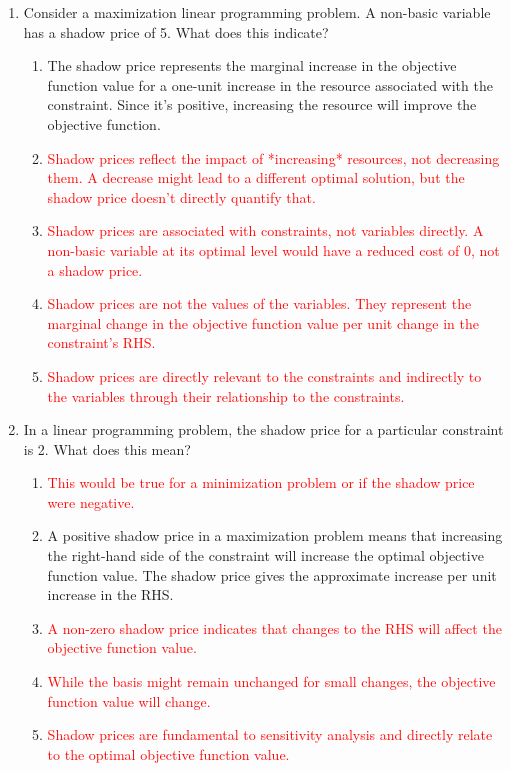 \documentclass{article}%
\newcommand{\incorrect}[1]{\textcolor{red}{#1}}
\begin{document}
\begin{enumerate}
\begin{enumerate}
\end{enumerate}%
\vspace{1em}%
\item Consider a maximization linear programming problem.  A non-basic variable has a shadow price of 5. What does this indicate?%
\begin{enumerate}%
\item The shadow price represents the marginal increase in the objective function value for a one-unit increase in the resource associated with the constraint. Since it's positive, increasing the resource will improve the objective function.%
\item \incorrect{Shadow prices reflect the impact of *increasing* resources, not decreasing them.  A decrease might lead to a different optimal solution, but the shadow price doesn't directly quantify that.}%
\item \incorrect{Shadow prices are associated with constraints, not variables directly.  A non-basic variable at its optimal level would have a reduced cost of 0, not a shadow price.}%
\item \incorrect{Shadow prices are not the values of the variables. They represent the marginal change in the objective function value per unit change in the constraint's RHS.}%
\item \incorrect{Shadow prices are directly relevant to the constraints and indirectly to the variables through their relationship to the constraints.}%
\end{enumerate}%
\vspace{1em}%
\item In a linear programming problem, the shadow price for a particular constraint is 2.  What does this mean?%
\begin{enumerate}%
\item \incorrect{This would be true for a minimization problem or if the shadow price were negative.}%
\item A positive shadow price in a maximization problem means that increasing the right-hand side of the constraint will increase the optimal objective function value. The shadow price gives the approximate increase per unit increase in the RHS.%
\item \incorrect{A non-zero shadow price indicates that changes to the RHS will affect the objective function value.}%
\item \incorrect{While the basis might remain unchanged for small changes, the objective function value will change.}%
\item \incorrect{Shadow prices are fundamental to sensitivity analysis and directly relate to the optimal objective function value.}%

\end{enumerate}
\end{enumerate}
\end{document}

